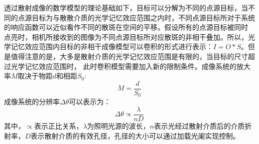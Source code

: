 透过散射成像的数学模型的理论基础如下，目标可以分解为不同的点源目标，当不同的点源目标为与散散介质的光学记忆效应范围之内时，不同点源目标所对于系统的响应函数可以近似看作不同的散斑在空间的平移。假设所有的点源目标被同时
点亮时，相机所接收到的图像为不同点源目标所对应散斑的非相干叠加。所以，光学记忆效应范围内目标的非相干成像模型可以卷积的形式进行表示：$I = O*S$。但是值得注意的是，大多是散射介质的光学记忆效应范围是有限的，当目标的尺寸超过光学记忆效应范围时，
此时卷积模型需要加入新的限制条件。成像系统的放大率$M$取决于物距$d$和相距$S_{0}$:
\begin{equation}
    M = \frac{d}{S_{0}}
\label{eq:magnification_imgaing_system}
\end{equation}
成像系统的分辨率$\Delta \theta $可以表示为：
\begin{equation}
    \Delta \theta   \propto \frac{\lambda}{nD}
\label{eq:angleresolution_imgaing_system}
\end{equation}
其中，$\propto$表示正比关系，$\lambda$为照明光源的波长，$n$表示光经过散射介质后的介质折射率，$D$表示散射介质的有效孔径，孔径的大小可以通过加载光阑实现控制。

